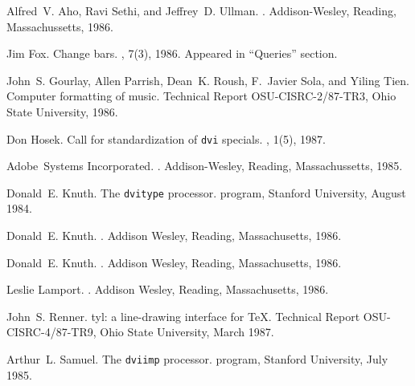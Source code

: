 \begin{thebibliography}{10}

Alfred~V. Aho, Ravi Sethi, and Jeffrey~D. Ullman.
.
\newblock Addison-Wesley, Reading, Massachussetts, 1986.

Jim Fox.
\newblock Change bars.
, 7(3), 1986.
\newblock Appeared in ``Queries'' section.

John~S. Gourlay, Allen Parrish, Dean~K. Roush, F.~Javier Sola, and Yiling Tien.
\newblock Computer formatting of music.
\newblock Technical Report OSU-CISRC-2/87-TR3, Ohio State University, 1986.

Don Hosek.
\newblock Call for standardization of {\tt dvi} specials.
\newblock {\em \TeXMaG}, 1(5), 1987.

Adobe~Systems Incorporated.
.
\newblock Addison-Wesley, Reading, Massachussetts, 1985.

Donald~E. Knuth.
\newblock The {\tt dvitype} processor.
 program, Stanford University, August 1984.

Donald~E. Knuth.
.
\newblock Addison Wesley, Reading, Massachusetts, 1986.

Donald~E. Knuth.
.
\newblock Addison Wesley, Reading, Massachusetts, 1986.

Leslie Lamport.
.
\newblock Addison Wesley, Reading, Massachusetts, 1986.

John~S. Renner.
\newblock {\TeX}tyl: a line-drawing interface for {\TeX}.
\newblock Technical Report OSU-CISRC-4/87-TR9, Ohio State University, March
  1987.

Arthur~L. Samuel.
\newblock The {\tt dviimp} processor.
 program, Stanford University, July 1985.

\end{thebibliography}

